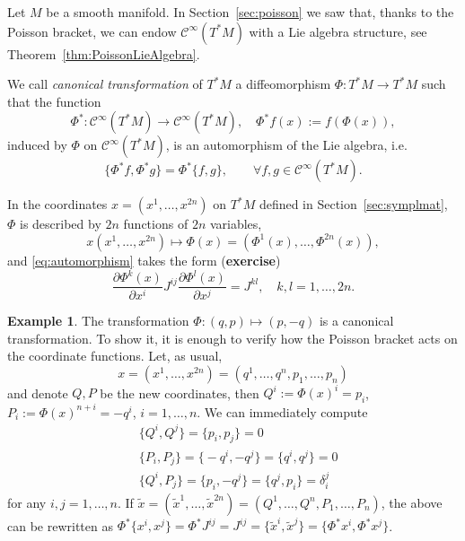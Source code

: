 \documentclass[english,fontsize=11pt,paper=b5]{scrbook}
\theoremstyle{definition}
\newtheorem{example}{Example}[chapter]
\begin{document}
    Let $M$ be a smooth manifold. In Section~\ref{sec:poisson} we saw that, thanks to the Poisson bracket, we can endow $\mathcal{C}^\infty(T^*M)$ with a Lie algebra structure, see Theorem~\ref{thm:PoissonLieAlgebra}.

    \begin{tcolorbox}
      We call \emph{canonical transformation} of $T^*M$ a diffeomorphism $\Phi: T^*M\to T^*M$ such that the function
      \begin{equation}
        \Phi^*: \mathcal{C}^\infty(T^*M) \to \mathcal{C}^\infty(T^*M),\quad
        \Phi^* f(x) := f(\Phi(x)),
      \end{equation}
      induced by $\Phi$ on $\mathcal{C}^\infty(T^*M)$, is an automorphism of the Lie algebra, i.e.
      \begin{equation}\label{eq:automorphism}
        \big\{\Phi^* f, \Phi^* g\big\} = \Phi^*\big\{f,g\big\}, \qquad\forall f,g\in\mathcal{C}^\infty(T^*M).
      \end{equation}
    \end{tcolorbox}

    In the coordinates $x=(x^1, \ldots, x^{2n})$ on $T^*M$ defined in Section~\ref{sec:symplmat}, $\Phi$ is described by $2n$ functions of $2n$ variables,
    \begin{equation}
      x(x^1,\ldots,x^{2n}) \mapsto \Phi(x) = \left(\Phi^1(x), \ldots, \Phi^{2n}(x)\right),
    \end{equation}
    and \eqref{eq:automorphism} takes the form (\textbf{exercise})
    \begin{equation}\label{eq:cantrafocoord}
      \frac{\partial\Phi^k(x)}{\partial x^i} J^{ij} \frac{\partial\Phi^l(x)}{\partial x^j} = J^{kl},\quad k,l=1,\ldots,2n.
    \end{equation}

    \begin{example}
      The transformation $\Phi: (q,p) \mapsto (p, -q)$ is a canonical transformation.
      To show it, it is enough to verify how the Poisson bracket acts on the coordinate functions. Let, as usual, \begin{equation}
        x=(x^1, \ldots,x^{2n})=(q^1,\ldots,q^n,p_1,\ldots,p_n)
      \end{equation}
      and denote $Q,P$ be the new coordinates, then $Q^i := \Phi(x)^i = p_i$, $P_i := \Phi(x)^{n+i} = -q^i$, $i=1,\ldots, n$.
      We can immediately compute
      \begin{align}
     & \big\{Q^i, Q^j\big\} = \big\{p_i, p_j\big\} = 0                                  \\
     & \big\{P_i, P_j\big\} = \big\{-q^i, -q^j\big\} = \big\{q^i, q^j\big\} = 0         \\
     & \big\{Q^i, P_j\big\} = \big\{p_i, -q^j\big\} = \big\{q^j, p_i\big\} = \delta^j_i
      \end{align}
      for any $i,j=1,\ldots,n$.
      If $\widetilde x = (\widetilde x^1, \ldots, \widetilde x^{2n})= (Q^1, \ldots, Q^n, P_1,\ldots,P_n)$, the above can be rewritten as $\Phi^*\big\{x^i, x^j\big\} = \Phi^* J^{ij} = J^{ij} = \big\{\widetilde x^i, \widetilde x^j\big\} = \big\{\Phi^* x^i, \Phi^* x^j\big\}$.
    \end{example}
\end{document}
